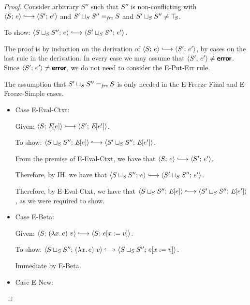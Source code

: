 \begin{proof}

  Consider arbitrary $S''$ such that $S''$ is non-conflicting with
  $\config{S}{e} \parstepsto \config{S'}{e'}$ and $S' \sqcup_{S} S''
  =_{\textit{frz}} S$ and $S' \sqcup_{S} S'' \neq \top\hspace{-0.85mm}_{S}$.

  To show: $\config{\lubstore{S}{S''}}{e} \parstepsto
  \config{\lubstore{S'}{S''}}{e'}$.

  The proof is by induction on the derivation of $\config{S}{e}
  \parstepsto \config{S'}{e'}$, by cases on the last rule in the
  derivation.  In every case we may assume that $\langle S';\, e' \rangle \neq
  \textbf{\textsf{error}}$.  Since $\langle S';\, e' \rangle \neq \textbf{\textsf{error}}$, we do not need to
  consider the {\sc E-Put-Err} rule.

  The assumption that $S' \sqcup_{S} S'' =_{\textit{frz}} S$ is only needed
  in the {\sc E-Freeze-Final} and {\sc E-Freeze-Simple} cases.

  \begin{itemize}

    \item Case {\sc E-Eval-Ctxt}:

      Given: $\config{S}{\E{e}} \parstepsto \config{S'}{\E{e'}}$.

      To show: $\config{\lubstore{S}{S''}}{\E{e}} \parstepsto
      \config{\lubstore{S'}{S''}}{\E{e'}}$.

      From the premise of {\sc E-Eval-Ctxt}, we have that
      $\config{S}{e} \parstepsto \config{S'}{e'}$.

      Therefore, by IH, we have that $\config{\lubstore{S}{S''}}{e}
      \parstepsto \config{\lubstore{S'}{S''}}{e'}$.

      Therefore, by {\sc E-Eval-Ctxt}, we have that
      $\config{\lubstore{S}{S''}}{\E{e}} \parstepsto
      \config{\lubstore{S'}{S''}}{\E{e'}}$, as we were required to
      show.

    \item Case {\sc E-Beta}:

      Given: $\config{S}{\app{(\lam{x}{e})}{v}} \parstepsto
      \config{S}{\subst{e}{x}{v}}$.

      To show: $\config{\lubstore{S}{S''}}{\app{(\lam{x}{e})}{v}} \parstepsto
      \config{\lubstore{S}{S''}}{\subst{e}{x}{v}}$.

      Immediate by {\sc E-Beta}.

    \item Case {\sc E-New}:


\end{itemize}
\end{proof}
